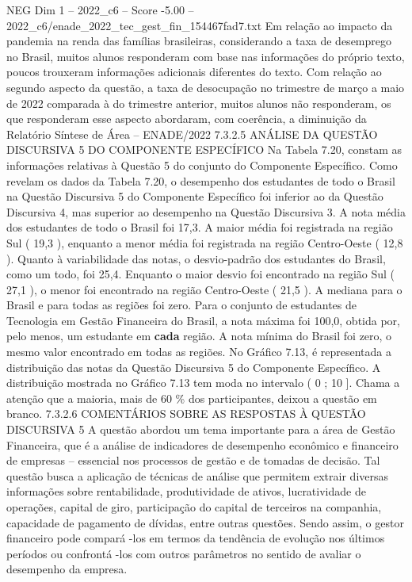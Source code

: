 \begin{textsample}{NEG Dim 1 – 2022\_c6 – Score -5.00 – 2022\_c6/enade\_2022\_tec\_gest\_fin\_154467fad7.txt}
Em relação ao impacto da pandemia na renda das famílias brasileiras, considerando a taxa de desemprego no Brasil, muitos alunos responderam com base nas informações do próprio texto, poucos trouxeram informações adicionais diferentes do texto.
Com relação ao segundo aspecto da questão, a taxa de desocupação no trimestre de março a maio de 2022 comparada à do trimestre anterior, muitos alunos não responderam, os que responderam esse aspecto abordaram, com coerência, a diminuição da Relatório Síntese de Área – ENADE/2022 7.3.2.5 ANÁLISE DA QUESTÃO DISCURSIVA 5 DO COMPONENTE ESPECÍFICO Na Tabela 7.20, constam as informações relativas à Questão 5 do conjunto do Componente Específico.
Como revelam os dados da Tabela 7.20, o desempenho dos estudantes de todo o Brasil na Questão Discursiva 5 do Componente Específico foi inferior ao da Questão Discursiva 4, mas superior ao desempenho na Questão Discursiva 3.
A nota média dos estudantes de todo o Brasil foi 17,3.
A maior média foi registrada na região Sul ( 19,3 ), enquanto a menor média foi registrada na região Centro-Oeste ( 12,8 ).
Quanto à variabilidade das notas, o desvio-padrão dos estudantes do Brasil, como um todo, foi 25,4.
Enquanto o maior desvio foi encontrado na região Sul ( 27,1 ), o menor foi encontrado na região Centro-Oeste ( 21,5 ).
A mediana para o Brasil e para todas as regiões foi zero.
Para o conjunto de estudantes de Tecnologia em Gestão Financeira do Brasil, a nota máxima foi 100,0, obtida por, pelo menos, um estudante em \textbf{cada} região.
A nota mínima do Brasil foi zero, o mesmo valor encontrado em todas as regiões.
No Gráfico 7.13, é representada a distribuição das notas da Questão Discursiva 5 do Componente Específico.
A distribuição mostrada no Gráfico 7.13 tem moda no intervalo ( 0 ; 10 ].
Chama a atenção que a maioria, mais de 60 \% dos participantes, deixou a questão em branco. 7.3.2.6 COMENTÁRIOS SOBRE AS RESPOSTAS À QUESTÃO DISCURSIVA 5 A questão abordou um tema importante para a área de Gestão Financeira, que é a análise de indicadores de desempenho econômico e financeiro de empresas – essencial nos processos de gestão e de tomadas de decisão.
Tal questão busca a aplicação de técnicas de análise que permitem extrair diversas informações sobre rentabilidade, produtividade de ativos, lucratividade de operações, capital de giro, participação do capital de terceiros na companhia, capacidade de pagamento de dívidas, entre outras questões.
Sendo assim, o gestor financeiro pode compará -los em termos da tendência de evolução nos últimos períodos ou confrontá -los com outros parâmetros no sentido de avaliar o desempenho da empresa.

\end{textsample}
